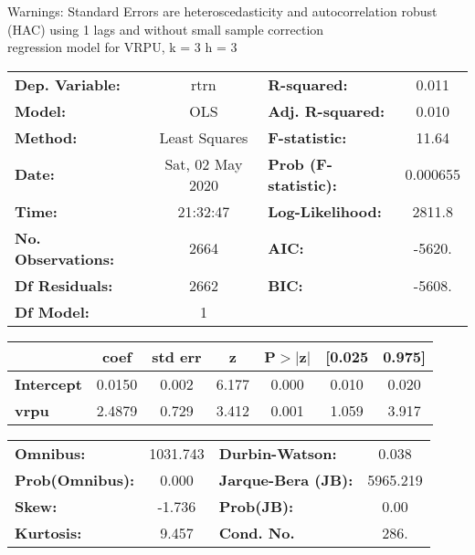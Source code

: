 Warnings: \newline
 [1] Standard Errors are heteroscedasticity and autocorrelation robust (HAC) using 1 lags and without small sample correction\\ 

regression model for VRPU, k = 3 h = 3\begin{center}
\begin{tabular}{lclc}
\toprule
\textbf{Dep. Variable:}    &       rtrn       & \textbf{  R-squared:         } &     0.011   \\
\textbf{Model:}            &       OLS        & \textbf{  Adj. R-squared:    } &     0.010   \\
\textbf{Method:}           &  Least Squares   & \textbf{  F-statistic:       } &     11.64   \\
\textbf{Date:}             & Sat, 02 May 2020 & \textbf{  Prob (F-statistic):} &  0.000655   \\
\textbf{Time:}             &     21:32:47     & \textbf{  Log-Likelihood:    } &    2811.8   \\
\textbf{No. Observations:} &        2664      & \textbf{  AIC:               } &    -5620.   \\
\textbf{Df Residuals:}     &        2662      & \textbf{  BIC:               } &    -5608.   \\
\textbf{Df Model:}         &           1      & \textbf{                     } &             \\
\bottomrule
\end{tabular}
\begin{tabular}{lcccccc}
                   & \textbf{coef} & \textbf{std err} & \textbf{z} & \textbf{P$> |$z$|$} & \textbf{[0.025} & \textbf{0.975]}  \\
\midrule
\textbf{Intercept} &       0.0150  &        0.002     &     6.177  &         0.000        &        0.010    &        0.020     \\
\textbf{vrpu}      &       2.4879  &        0.729     &     3.412  &         0.001        &        1.059    &        3.917     \\
\bottomrule
\end{tabular}
\begin{tabular}{lclc}
\textbf{Omnibus:}       & 1031.743 & \textbf{  Durbin-Watson:     } &    0.038  \\
\textbf{Prob(Omnibus):} &   0.000  & \textbf{  Jarque-Bera (JB):  } & 5965.219  \\
\textbf{Skew:}          &  -1.736  & \textbf{  Prob(JB):          } &     0.00  \\
\textbf{Kurtosis:}      &   9.457  & \textbf{  Cond. No.          } &     286.  \\
\bottomrule
\end{tabular}
\end{center}

